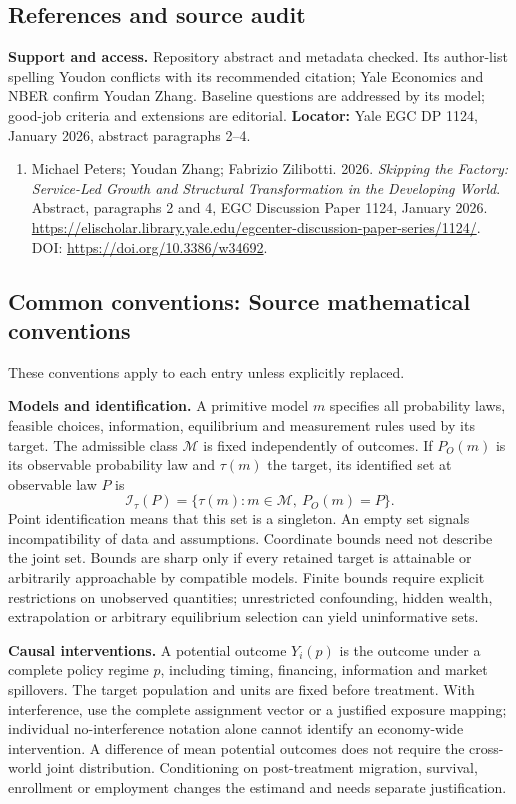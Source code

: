 \documentclass[11pt,a4paper]{article}
\begin{document}
\subsection*{References and source audit}
\textbf{Support and access.} Repository abstract and metadata checked. Its author-list spelling Youdon conflicts with its recommended citation; Yale Economics and NBER confirm Youdan Zhang. Baseline questions are addressed by its model; good-job criteria and extensions are editorial. \textbf{Locator:} Yale EGC DP 1124, January 2026, abstract paragraphs 2--4.
\begin{enumerate}\raggedright
\item\hypertarget{definitions:source:30007660:1}{} Michael Peters; Youdan Zhang; Fabrizio Zilibotti. 2026. \emph{Skipping the Factory: Service-Led Growth and Structural Transformation in the Developing World}. Abstract, paragraphs 2 and 4, EGC Discussion Paper 1124, January 2026.
\url{https://elischolar.library.yale.edu/egcenter-discussion-paper-series/1124/}.
DOI: \url{https://doi.org/10.3386/w34692}.
\end{enumerate}

\subsection*{Common conventions: Source mathematical conventions}

These conventions apply to each entry unless explicitly replaced.

\textbf{Models and identification.} A primitive model \(m\) specifies all probability laws, feasible choices, information, equilibrium and measurement rules used by its target. The admissible class \(\mathcal M\) is fixed independently of outcomes. If \(P_O(m)\) is its observable probability law and \(\tau(m)\) the target, its identified set at observable law \(P\) is
\[
 \mathcal I_\tau(P)=\{\tau(m):m\in\mathcal M,\ P_O(m)=P\}.
\]
Point identification means that this set is a singleton. An empty set signals incompatibility of data and assumptions. Coordinate bounds need not describe the joint set. Bounds are sharp only if every retained target is attainable or arbitrarily approachable by compatible models. Finite bounds require explicit restrictions on unobserved quantities; unrestricted confounding, hidden wealth, extrapolation or arbitrary equilibrium selection can yield uninformative sets.

\textbf{Causal interventions.} A potential outcome \(Y_i(p)\) is the outcome under a complete policy regime \(p\), including timing, financing, information and market spillovers. The target population and units are fixed before treatment. With interference, use the complete assignment vector or a justified exposure mapping; individual no-interference notation alone cannot identify an economy-wide intervention. A difference of mean potential outcomes does not require the cross-world joint distribution. Conditioning on post-treatment migration, survival, enrollment or employment changes the estimand and needs separate justification.
\end{document}
